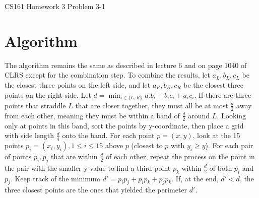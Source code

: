 \documentclass[12pt]{article}
\begin{document}
\begin{center}
{\Large CS161 Homework 3 Problem 3-1}

\end{center}

\section*{Algorithm}
The algorithm remains the same as described in lecture 6 and on page 1040 of CLRS except for the combination step. To combine the results, let $a_L, b_L, c_L$ be the closest three points on the left side, and let $a_R, b_R, c_R$ be the closest three points on the right side. Let $d = \min_{i \in \{L, R\}} a_i b_i + b_i c_i + a_i c_i$. If there are three points that straddle $L$ that are closer together, they must all be at most $\frac{d}{2}$ away from each other, meaning they must be within a band of $\frac{d}{2}$ around $L$. Looking only at points in this band, sort the points by y-coordinate, then place a grid with side length $\frac{d}{4}$ onto the band. For each point $p = (x, y)$, look at the 15 points $p_i = (x_i, y_i), 1 \le i \le 15$ above $p$ (closest to $p$ with $y_i \ge y$). For each pair of points $p_i, p_j$ that are within $\frac{d}{2}$ of each other, repeat the process on the point in the pair with the smaller y value to find a third point $p_k$ within $\frac{d}{2}$ of both $p_i$ and $p_j$. Keep track of the minimum $d' = p_i p_j + p_i p_k + p_j p_k$. If, at the end, $d' < d$, the three closest points are the ones that yielded the perimeter $d'$. 
\end{document}
